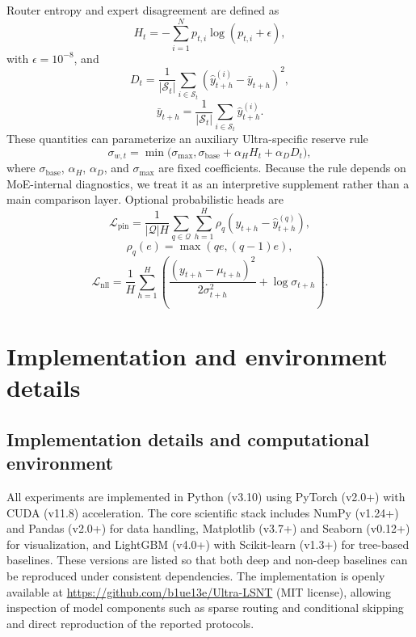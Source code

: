 \documentclass[review,1p,times]{elsarticle}
\begin{document}
Router entropy and expert disagreement are defined as
\begin{equation}
H_t = -\sum_{i=1}^{N} p_{t,i} \log(p_{t,i} + \epsilon),
\end{equation}
with $\epsilon=10^{-8}$, and
\begin{equation}
D_t = \frac{1}{|\mathcal{S}_t|} \sum_{i \in \mathcal{S}_t} \left(\hat{y}^{(i)}_{t+h} - \bar{y}_{t+h}\right)^2,
\end{equation}
\begin{equation}
\bar{y}_{t+h} = \frac{1}{|\mathcal{S}_t|} \sum_{i \in \mathcal{S}_t} \hat{y}^{(i)}_{t+h}.
\end{equation}
These quantities can parameterize an auxiliary Ultra-specific reserve rule
\begin{equation}
\sigma_{w,t} = \min\Big(\sigma_{\max}, \sigma_{\mathrm{base}} + \alpha_H H_t + \alpha_D D_t\Big),
\end{equation}
where $\sigma_{\mathrm{base}}$, $\alpha_H$, $\alpha_D$, and $\sigma_{\max}$ are fixed coefficients. Because the rule depends on MoE-internal diagnostics, we treat it as an interpretive supplement rather than a main comparison layer. Optional probabilistic heads are
\begin{equation}
\mathcal{L}_{\text{pin}}=\frac{1}{|\mathcal{Q}|H}\sum_{q\in\mathcal{Q}}\sum_{h=1}^{H}\rho_q\!\left(y_{t+h}-\hat{y}^{(q)}_{t+h}\right),
\end{equation}
\begin{equation}
\rho_q(e)=\max(qe,(q-1)e),
\end{equation}
\begin{equation}
\mathcal{L}_{\text{nll}}=\frac{1}{H}\sum_{h=1}^{H}\left(\frac{(y_{t+h}-\mu_{t+h})^2}{2\sigma_{t+h}^2}+\log\sigma_{t+h}\right).
\end{equation}

\section{Implementation and environment details}\label{app:impl_details}

\subsection{Implementation details and computational environment}
\label{app:impl_details_sub}

All experiments are implemented in Python (v3.10) using PyTorch (v2.0+) with CUDA (v11.8) acceleration. The core scientific stack includes NumPy (v1.24+) and Pandas (v2.0+) for data handling, Matplotlib (v3.7+) and Seaborn (v0.12+) for visualization, and LightGBM (v4.0+) with Scikit-learn (v1.3+) for tree-based baselines. These versions are listed so that both deep and non-deep baselines can be reproduced under consistent dependencies. The implementation is openly available at \url{https://github.com/b1ue13e/Ultra-LSNT} (MIT license), allowing inspection of model components such as sparse routing and conditional skipping and direct reproduction of the reported protocols.
\end{document}
